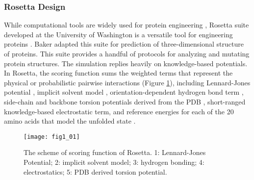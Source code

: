 \begin{refsection}
\subsubsection{Rosetta Design}

While computational tools are widely used for protein
engineering \cite{Rothlisberger2008,DiMaio2011a,Korkegian2005,
Leaver-Fay2013a,Leaver-Fay2011,Drew2013a,Kaufmann2010,Rohl2004}, Rosetta suite
developed at the University of Washington is a versatile tool for engineering
proteins \cite{Leaver-Fay2011}. Baker  adapted this suite for
prediction of three-dimensional structure of proteins\cite{Leaver-Fay2011}.
This suite provides a handful of protocols for analyzing and mutating protein
structures.  The simulation replies heavily on knowledge-based potentials. In
Rosetta, the scoring function sums the weighted terms that represent the
physical or probabilistic pairwise interactions \cite{Rohl2004} (Figure
\ref{fig:rosetta-intro}), including Lennard-Jones potential
\cite{Clementi1999}, implicit solvent model \cite{Lazaridis1999},
orientation-dependent hydrogen bond term \cite{Kortemme2003}, side-chain and
backbone torsion potentials derived from the PDB \cite{Rohl2002}, short-ranged
knowledge-based electrostatic term\cite{Leaver-Fay2013a}, and reference
energies for each of the 20 amino acids that model the unfolded state
\cite{Leaver-Fay2013a}.
\begin{figure}[htbp] \centering \texttt{[image: fig1\_01]}
    \caption[The scheme of scoring function of Rosetta. 1: Lennard-Jones
    Potential; 2: implicit solvent model; 3: hydrogen bonding; 4:
electrostatics; 5: PDB drived torsion potential.]{The scheme of scoring
    function of Rosetta. 1: Lennard-Jones Potential; 2: implicit solvent model;
3: hydrogen bonding; 4: electrostatics; 5: PDB derived torsion potential.}
\label{fig:rosetta-intro}
\end{figure}


\end{refsection}

